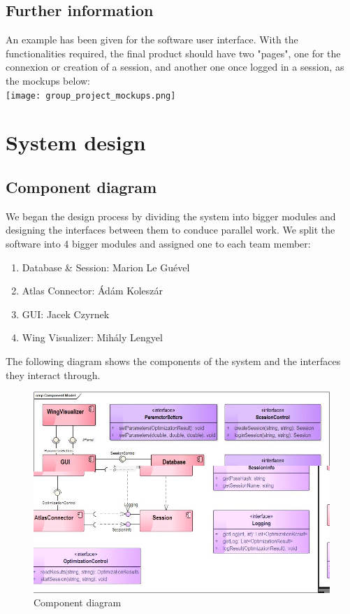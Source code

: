 \documentclass[10pt,a4paper]{report}
\begin{document}
	\section{Further information}
An example has been given for the software user interface. With the functionalities required, the final product should have two "pages", one for the connexion or creation of a session, and another one once logged in a session, as the mockups below:\\
\texttt{[image: group\_project\_mockups.png]}

\pagebreak
\chapter{System design}
\section{Component diagram}
We began the design process by dividing the system into bigger modules and designing the interfaces between them to conduce parallel work. We split the software into 4 bigger modules and assigned one to each team member:\\
\begin{enumerate}
\item Database \& Session: Marion Le Guével
\item Atlas Connector: Ádám Koleszár
\item GUI: Jacek Czyrnek
\item Wing Visualizer: Mihály Lengyel
\end{enumerate}
The following diagram shows the components of the system and the interfaces they interact through.
\begin{figure}[h!]
\includegraphics[width=\textwidth]{CompModel.jpg}
\caption{Component diagram}
\end{figure}
\pagebreak
\end{document}
